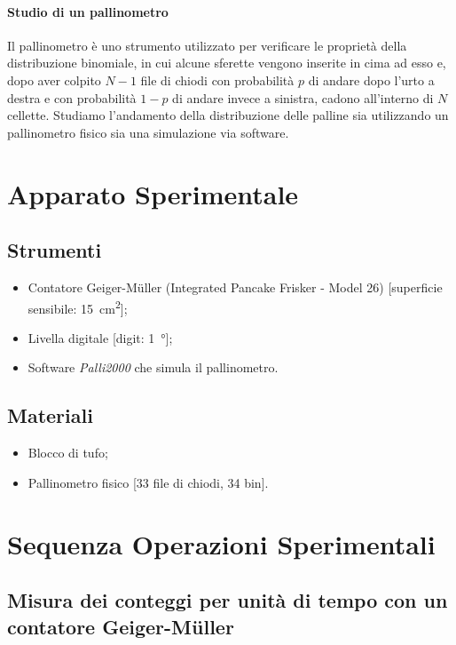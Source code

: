 \documentclass[10pt,oneside,a4paper]{article}
\begin{document}
\paragraph{Studio di un pallinometro}
Il pallinometro è uno strumento utilizzato per verificare le proprietà della distribuzione binomiale, in cui alcune sferette vengono inserite in cima ad esso e, dopo aver colpito $N-1$ file di chiodi con probabilità $p$ di andare dopo l'urto a destra e con probabilità $1-p$ di andare invece a sinistra, cadono all'interno di $N$ cellette. Studiamo l'andamento della distribuzione delle palline sia utilizzando un pallinometro fisico sia una simulazione via software.


\section{Apparato Sperimentale}
	
\subsection{Strumenti}
\label{subsec:strumenti}
\begin{itemize}
\item Contatore Geiger-Müller (Integrated Pancake Frisker - Model 26) [superficie sensibile: \SI{15}{cm^2}];
\item Livella digitale [digit: \SI{1}{°}];
\item Software \emph{Palli2000} che simula il pallinometro.
\end{itemize}

\subsection{Materiali}
\begin{itemize}
\item Blocco di tufo;
\item Pallinometro fisico [33 file di chiodi, 34 bin].
\end{itemize}


\section{Sequenza Operazioni Sperimentali} 

\subsection{Misura dei conteggi per unità di tempo con un contatore Geiger-Müller}
\end{document}
